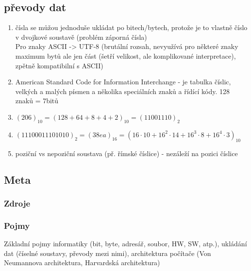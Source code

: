 \documentclass[12pt]{article}
\begin{document}
\subsection{převody dat}
\begin{enumerate}
\item čísla se můžou jednoduše ukládat po bitech/bytech, protože je to vlastně číslo v dvojkové soustavě (problém záporná čísla)\\
Pro znaky ASCII -> UTF-8 (brutální rozsah, nevyužívá pro některé znaky maximum bytů ale jen část (šetří velikost, ale komplikované interpretace), zpětně kompatibilní s ASCII)
\item American Standard Code for Information Interchange - je tabulka číslic, velkých a malých písmen a několika speciálních znaků a řídící kódy. 128 znaků = 7bitů
\item $(206)_10 = (128 + 64 + 8 + 4 +2)_10 = (11001110)_2$
\item $(11100011101010)_2 = (38ea)_{16} = (16 \cdot 10 + 16^2 \cdot 14 + 16^3 \cdot 8 + 16^4 \cdot 3)_10$
\item poziční vs nepoziční soustava (př. římské číslice) - nezáleží na pozici číslice
\end{enumerate}
\subsection{Meta}
\subsubsection{Zdroje}
\subsubsection{Pojmy}
Základní pojmy informatiky (bit, byte, adresář, soubor, HW, SW, atp.), ukládání dat (číselné soustavy, převody mezi nimi), architektura počítače (Von Neumannova architektura, Harvardská architektura)
\end{document}
